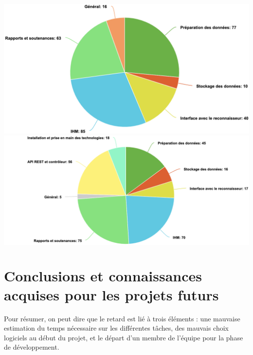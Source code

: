 \begin{mdframed}[frametitle={Figure 1 : Répartitions théorique et réelle des heures du projet}, innerbottommargin=10]
\begin{center}
\includegraphics[scale=0.6]{assets/repartition1.png}
\includegraphics[scale=0.6]{assets/repartition2.png}
\end{center}
\end{mdframed}

\section{Conclusions et connaissances acquises pour les projets futurs}

\paragraph{}
Pour résumer, on peut dire que le retard est lié à trois éléments : une mauvaise estimation du temps nécessaire sur les différentes tâches, des mauvais choix logiciels au début du projet, et le départ d'un membre de l'équipe pour la phase de développement.

